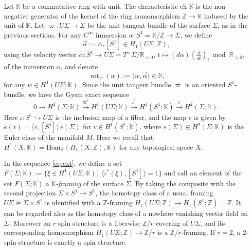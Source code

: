 \documentclass[a4paper,12pt, twoside]{amsart}
\theoremstyle{definition}
\theoremstyle{remark}
\numberwithin{equation}{section}
\newcommand\bK{{\mathbb{K}}}
\newcommand\bR{{\mathbb{R}}}
\newcommand\bZ{{\mathbb{Z}}}
\newcommand\ch{\mathrm{ch}\,}
\newcommand\pa{\partial}
\newcommand\rot{\operatorname{rot}}
\begin{document}
Let $\bK$ be a commutative ring with unit. The characteristic 
$\ch\,\bK$ is the non-negative generator of the kernel of the ring homomorphism $\bZ \to\bK$ induced by the unit of $\bK$.
Let $\varpi: U\Sigma \to \Sigma$ be the unit tangent bundle of the surface $\Sigma$, as in the previous sections. For any $C^\infty$ immersion $\alpha: S^1= \bR/\bZ\to \Sigma$, we define 
$$
\overrightarrow{\alpha} := \overset\cdot\alpha_*[S^1] \in H_1(U\Sigma; \bZ), 
$$
using the velocity vector 
$\overset\cdot\alpha: S^1 \to U\Sigma = T^\times\Sigma/\bR_{>0}$, $t \mapsto (d\alpha)\left(\frac{\pa}{\pa t}\right)_t \bmod \bR_{>0}$, of the immersion $\alpha$, and denote
\begin{equation}\label{eq:rotw}
\rot_w(\alpha) := \langle w, \overrightarrow{\alpha}\rangle \in \bK.
\end{equation}
for any $w \in H^1(U\Sigma; \bK)$. %
Since the unit tangent bundle $\varpi$ is an oriented $S^1$-bundle, we have the Gysin exact sequence 
\begin{equation}\label{eq:ext}
0 \to  H^1(\Sigma; \bK) \overset{\varpi^*}\to H^1(U\Sigma; \bK) 
\overset{\iota^*}\to H^1(S^1; \bK) \overset{e}\to H^2(\Sigma; \bK).
\end{equation}
Here $\iota: S^1\hookrightarrow U\Sigma$ is the inclusion map of a fiber, and the map $e$ is given by $e(v) = \langle v, [S^1]\rangle\, e(\Sigma)$ for $v \in H^1(S^1; \bK)$, where $e(\Sigma) \in H^2(\Sigma; \bK)$ is the Euler class of the manifold $M$. 
Here we recall that $H^1(X; \bK) = \mathrm{Hom}_\bZ(H_1(X; \bZ), \bK)$ for any topological space $X$. \par

In the sequence \eqref{eq:ext}, we define a set $F(\Sigma; \bK) := \{\xi \in H^1(U\Sigma; \bK); \,\, \langle \iota^*(\xi), [S^1]\rangle = 1\}$ and call an element of the set $F(\Sigma; \bK)$ a {\it $\bK$-framing} of the surface $\Sigma$. 
By taking the composite with the second projection $\Sigma\times S^1 \to S^1$, the homotopy class of a usual framing $U\Sigma \cong \Sigma\times S^1$ is identified with a $\bZ$-framing $H_1(U\Sigma; \bZ) \to H_1(S^1; \bZ) = \bZ$. It can be regarded also as the homotopy class of a nowhere vanishing vector field on $\Sigma$. Moreover an $r$-spin structure is a fiberwise $\bZ/r$-covering of $U\Sigma$, and its corresponding homomorphism  $H_1(U\Sigma; \bZ) \to \bZ/r$ is a $\bZ/r$-framing. If $r=2$, a $2$-spin structure is exactly a spin structure.\par
\end{document}
